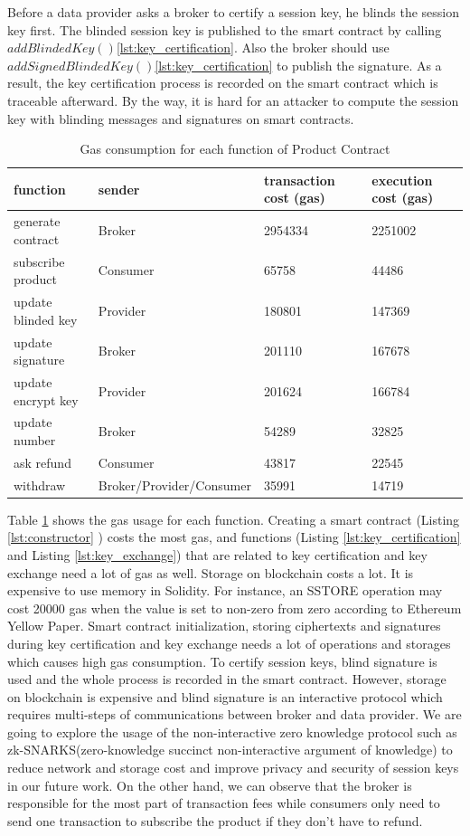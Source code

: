 \documentclass[journal,article,applsci,submit,moreauthors,pdftex]{Definitions/mdpi}
\begin{document}
Before a data provider asks a broker to certify a session key, he blinds the session key first. The blinded session key is published to the smart contract by calling $addBlindedKey()$\ref{lst:key_certification}. Also the broker should use $addSignedBlindedKey()$\ref{lst:key_certification} to publish the signature. As a result, the key certification process is recorded on the smart contract which is traceable afterward. By the way, it is hard for an attacker to compute the session key with blinding messages and signatures on smart contracts.

\begin{table}[H]
	\caption{Gas consumption for each function of Product Contract}
	\label{tab:gas}
	\begin{tabular}{|l|l|l|l|}
		\hline
		function & sender & transaction cost (gas) & execution cost (gas) \\ \hline
		generate contract & Broker & 2954334 & 2251002 \\ \hline
		subscribe product & Consumer & 65758 & 44486 \\ \hline
		update blinded key & Provider & 180801 & 147369 \\ \hline
		update signature & Broker & 201110 & 167678 \\ \hline
		update encrypt key & Provider & 201624 & 166784 \\ \hline
		update number & Broker & 54289 & 32825 \\ \hline
		ask refund & Consumer & 43817 & 22545 \\ \hline
		withdraw & Broker/Provider/Consumer & 35991 & 14719 \\ \hline
	\end{tabular}
\end{table}

Table \ref{tab:gas} shows the gas usage for each function. Creating a smart contract (Listing \ref{lst:constructor} ) costs the most gas, and functions (Listing \ref{lst:key_certification} and Listing \ref{lst:key_exchange}) that are related to key certification and key exchange need a lot of gas as well. Storage on blockchain costs a lot. It is expensive to use memory in Solidity. For instance, an SSTORE operation may cost 20000 gas when the value is set to non-zero from zero according to Ethereum Yellow Paper\cite{Ethereum}. Smart contract initialization, storing ciphertexts and signatures during key certification and key exchange needs a lot of operations and storages which causes high gas consumption. To certify session keys, blind signature is used and the whole process is recorded in the smart contract. However, storage on blockchain is expensive and blind signature is an interactive protocol which requires multi-steps of communications between broker and data provider. We are going to explore the usage of the non-interactive zero knowledge protocol such as zk-SNARKS(zero-knowledge succinct non-interactive argument of knowledge)\cite{Snark} to reduce network and storage cost and improve privacy and security of session keys in our future work. On the other hand, we can observe that the broker is responsible for the most part of transaction fees while consumers only need to send one transaction to subscribe the product if they don't have to refund.
\end{document}
